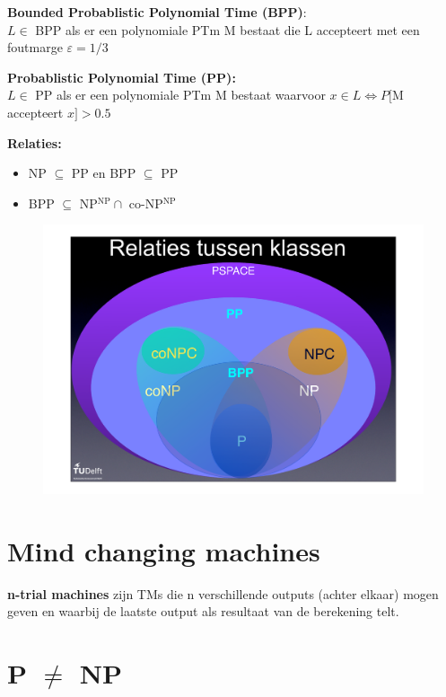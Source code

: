 \documentclass[]{article}
\begin{document}
\medskip

\textbf{Bounded Probablistic Polynomial Time (BPP)}: \\
\hspace*{1cm} $L \in$ BPP als er een polynomiale PTm M bestaat die L accepteert met een foutmarge $\varepsilon = 1/3$

\textbf{Probablistic Polynomial Time (PP):} \\
\hspace*{1cm} $L \in$ PP als er een polynomiale PTm M bestaat waarvoor $x \in L \Leftrightarrow P[$M accepteert $x] > 0.5$

\textbf{Relaties:}
\begin{itemize}
\item NP $\subseteq$ PP en BPP $\subseteq$ PP
\item BPP $\subseteq$ NP$^\text{NP} \cap$ co-NP$^\text{NP}$
\end{itemize}

\begin{figure}[H]
\centering
\includegraphics[width=0.6\columnwidth]{slides/bpp}
\end{figure}

\section*{Mind changing machines}

\textbf{n-trial machines} zijn TMs die n verschillende outputs (achter elkaar) mogen geven en waarbij de laatste output als resultaat van de berekening telt.


\section*{P $\not=$ NP}
\end{document}
